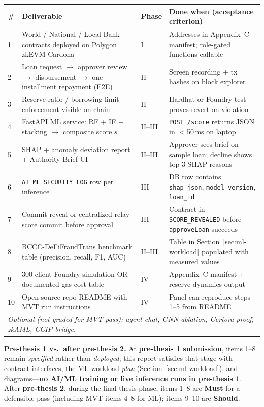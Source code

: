\documentclass[12pt, a4paper]{report}
\newcommand{\tableheadcolor}{\rowcolor{TableHeadBg}}
\begin{document}
\begin{table}[H]
\centering
\begin{tabular}{p{0.5cm}p{4.8cm}p{1.6cm}p{6.3cm}}
\toprule
\tableheadcolor
\textbf{\#} & \textbf{Deliverable} & \textbf{Phase} & \textbf{Done when (acceptance criterion)} \\
\midrule
1 & World / National / Local Bank contracts deployed on Polygon zkEVM Cardona & I & Addresses in Appendix~C manifest; role-gated functions callable \\
2 & Loan request $\to$ approver review $\to$ disbursement $\to$ one installment repayment (E2E) & II & Screen recording + tx hashes on block explorer \\
3 & Reserve-ratio / borrowing-limit enforcement visible on-chain & II & Hardhat or Foundry test proves revert on violation \\
4 & FastAPI ML service: RF + IF + stacking $\to$ composite score $s$ & II--III & \texttt{POST /score} returns JSON in $<$50\,ms on laptop \\
5 & SHAP + anomaly deviation report + Authority Brief UI & II--III & Approver sees brief on sample loan; decline shows top-3 SHAP reasons \\
6 & \texttt{AI\_ML\_SECURITY\_LOG} row per inference & III & DB row contains \texttt{shap\_json}, \texttt{model\_version}, \texttt{loan\_id} \\
7 & Commit-reveal or centralized relay score commit before approval & III & Contract in \texttt{SCORE\_REVEALED} before \texttt{approveLoan} succeeds \\
8 & BCCC-DeFiFraudTrans benchmark table (precision, recall, F1, AUC) & II--III & Table in Section~\ref{sec:ml-workload} populated with measured values \\
9 & 300-client Foundry simulation OR documented gas-cost table & IV & Appendix~C manifest + reserve dynamics output \\
10 & Open-source repo README with MVT run instructions & IV & Panel can reproduce steps 1--5 from README \\
\multicolumn{4}{l}{\textit{Optional (not graded for MVT pass): agent chat, GNN ablation, Certora proof, zkAML, CCIP bridge.}} \\
\bottomrule
\end{tabular}
\end{table}

\noindent\textbf{Pre-thesis 1 vs.\ after pre-thesis 2.} At \textbf{pre-thesis 1 submission}, items 1--8 remain \textit{specified} rather than \textit{deployed}; this report satisfies that stage with contract interfaces, the ML workload \textit{plan} (Section~\ref{sec:ml-workload}), and diagrams---\textbf{no AI/ML training or live inference runs in pre-thesis 1}. After \textbf{pre-thesis 2}, during the final thesis phase, items 1--8 are \textbf{Must} for a defensible pass (including MVT items 4--8 for ML); items 9--10 are \textbf{Should}.
\end{document}
